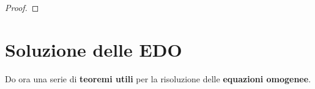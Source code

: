 \documentclass[a4paper, oneside]{article}
\begin{document}
\begin{theorem}
\begin{proof}
            \end{proof}
        \end{theorem}

    \newpage

    \section{Soluzione delle EDO}

    Do ora una serie di \textbf{teoremi utili} per la risoluzione delle \textbf{equazioni omogenee}.
\end{document}
